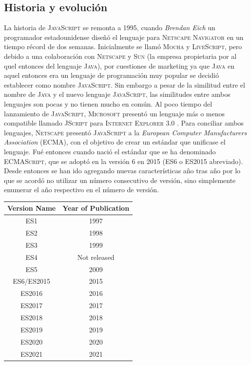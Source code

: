 \documentclass[a4paper, 11pt]{book}
\begin{document}
\subsection{Historia y evolución}
La historia de \textsc{JavaScript} se remonta a 1995, cuando \emph{Brendan Eich} un programador estadounidense diseñó el lenguaje para \textsc{Netscape Navigator} en un tiempo récord de dos semanas. Inicialmente se llamó \textsc{Mocha} y \textsc{LiveScript}, pero debido  a una colaboración con \textsc{Netscape} y \textsc{Sun} (la empresa propietaria por al quel entonces del lenguaje \textsc{Java}), por cuestiones de marketing ya que \textsc{Java} en aquel entonces era un lenguaje de programación muy popular se decidió establecer como nombre \textsc{JavaScript}.
Sin embargo a pesar de la similitud entre el nombre de \textsc{Java} y el nuevo lenguaje \textsc{JavaScript}, las similitudes entre ambos lenguajes son pocas y no tienen mucho en común.
Al poco tiempo del lanzamiento de \textsc{JavaScript}, \textsc{Microsoft} presentó un lenguaje más o menos compatible llamado \textsc{JScript} para \textsc{Internet Explorer 3.0} .
Para conciliar ambos lenguajes, \textsc{Netscape} presentó \textsc{JavaScript} a la \emph{European Computer Manufacturers Association} (\textsc{ECMA}), con el objetivo de crear un estándar que unificase el lenguaje. Fué entonces cuando nació el estándar que se ha denominado \textsc{ECMAScript}, que se adoptó en la versión 6 en 2015 (\textsc{ES6} o \textsc{ES2015} abreviado). Desde entonces se han ido agregando nuevas características año tras año por lo que se acordó no utilizar un número consecutivo de versión, sino simplemente enumerar el año respectivo en el número de versión.
\begin{center}
  \begin{tabular}{|c|c|}
    \hline
    \textbf{Version Name} & \textbf{Year of Publication} \\
    \hline
    ES1 & 1997 \\
    ES2 & 1998 \\
    ES3 & 1999 \\
    ES4 & Not released \\
    ES5 & 2009 \\
    ES6/ES2015 & 2015 \\
    ES2016 & 2016 \\
    ES2017 & 2017 \\
    ES2018 & 2018 \\
    ES2019 & 2019 \\
    ES2020 & 2020 \\
    ES2021 & 2021 \\
    \hline
  \end{tabular}
\end{center}
\end{document}

